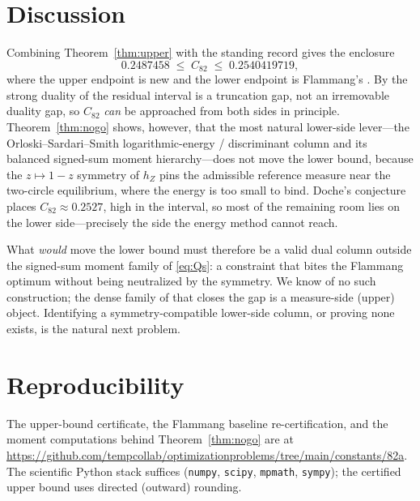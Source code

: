 \documentclass[11pt,reqno]{amsart}
\theoremstyle{plain}
\theoremstyle{definition}
\newcommand{\hZ}{h_Z}
\newcommand{\Cee}{C_{82}}
\newcommand{\repo}{\url{https://github.com/tempcollab/optimizationproblems/tree/main/constants/82a}}
\begin{document}
\section{Discussion}\label{sec:discussion}

Combining Theorem~\ref{thm:upper} with the standing record gives the enclosure
\[
  0.2487458\;\le\;\Cee\;\le\;0.2540419719,
\]
where the upper endpoint is new and the lower endpoint is Flammang's
\citep{F18}. By the strong duality of \citet[Thm.~6.5]{BMQS} the residual interval
is a truncation gap, not an irremovable duality gap, so $\Cee$ \emph{can} be
approached from both sides in principle. Theorem~\ref{thm:nogo} shows, however,
that the most natural lower-side lever---the Orloski--Sardari--Smith
logarithmic-energy / discriminant column and its balanced signed-sum moment
hierarchy---does not move the lower bound, because the $z\mapsto1-z$ symmetry of
$\hZ$ pins the admissible reference measure near the two-circle equilibrium, where
the energy is too small to bind. Doche's conjecture \citep{Doc01b} places
$\Cee\approx0.2527$, high in the interval, so most of the remaining room lies on
the lower side---precisely the side the energy method cannot reach.

What \emph{would} move the lower bound must therefore be a valid dual column
outside the signed-sum moment family of \eqref{eq:Qs}: a constraint that bites the
Flammang optimum without being neutralized by the symmetry. We know of no such
construction; the dense family of \citet[Thm.~4.5]{BMQS} that closes the gap is a
measure-side (upper) object. Identifying a symmetry-compatible lower-side column,
or proving none exists, is the natural next problem.

\section{Reproducibility}\label{sec:repro}

The upper-bound certificate, the Flammang baseline re-certification, and the
moment computations behind Theorem~\ref{thm:nogo} are at \repo. The scientific
Python stack suffices (\texttt{numpy}, \texttt{scipy}, \texttt{mpmath},
\texttt{sympy}); the certified upper bound uses directed (outward) rounding.
\end{document}
